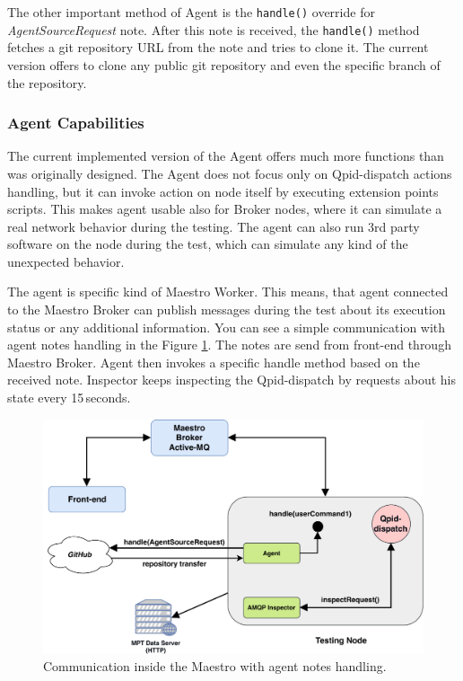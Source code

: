The other important method of Agent is the \texttt{handle()} override for \emph{AgentSourceRequest} note. After this note is received, the \texttt{handle()} method fetches a git repository URL from the note and tries to clone it. The current version offers to clone any public git repository and even the specific branch of the repository.

\subsubsection*{Agent Capabilities}
\label{Agent Capabilities}
The current implemented version of the Agent offers much more functions than was originally designed. The Agent does not focus only on Qpid-dispatch actions handling, but it can invoke action on node itself by executing extension points scripts. This makes agent usable also for Broker nodes, where it can simulate a real network behavior during the testing. The agent can also run 3rd party software on the node during the test, which can simulate any kind of  the unexpected behavior.

The agent is specific kind of Maestro Worker. This means, that agent connected to the Maestro Broker can publish messages during the test about its execution status or any additional information. You can see a simple communication with agent notes handling in the Figure \ref{fig:agent_demo}. The notes are send from front-end through Maestro Broker. Agent then invokes a specific handle method based on the received note. Inspector keeps inspecting the Qpid-dispatch by requests about his state every 15\,seconds.

\begin{figure}[H]
  \centering
  \includegraphics[width=13cm]{obrazky-figures/agent_demo.pdf}
  \caption{Communication inside the Maestro with agent notes handling.}
  \label{fig:agent_demo}
\end{figure}

